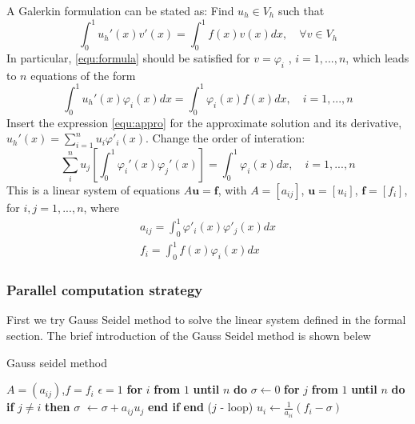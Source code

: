 \documentclass[11pt]{article}
\begin{document}
A Galerkin formulation can be stated as: Find $u_h \in V_h$ such that
\begin{equation}\label{equ:formula}
	\int_0^1u_h'(x)v'(x) = \int_0^1f(x)v(x) dx, \quad \forall v \in V_h 
\end{equation}
In particular, \eqref{equ:formula} should be satisfied for $v = \varphi_i$ , $i = 1,...,n$, which leads to $n$ equations of the form
\begin{equation}
	\int_0^1 u_h'(x)\varphi_i(x)dx = \int_0^1\varphi_i(x)f(x)dx, \quad i = 1,...,n
\end{equation}
Insert the expression \eqref{equ:appro} for the approximate solution and its derivative, $u_h'(x) = \sum_{i=1}^n u_i\varphi'_i(x)$.
Change the order of interation:
\begin{equation}
	\sum_i^n u_j\left[\int_0^1\varphi_i'(x) \varphi_j'(x)\right]= \int_0^1\varphi_i(x) dx, \quad i = 1,...,n
\end{equation}
This is a linear system of equations $A\mathbf{u} = \mathbf{f}$, with $A = [a_{ij}]$, $\mathbf{u} = [u_i]$, $\mathbf{f} = [f_i]$, for $i,j = 1,...,n$, where
\begin{align}
	a_{ij} = \int_0^1\varphi'_i(x)\varphi'_j(x)dx \\
	f_i  = \int_0^1f(x)\varphi_i(x) dx
\end{align}

\subsubsection{Parallel computation strategy}
First we try Gauss Seidel method to solve the linear system defined in the formal section. The brief introduction of the Gauss Seidel method is shown belew
\begin{algorithm}
\caption{Gauss seidel method}\label{alg:gauss_seidel}
\begin{algorithmic}
\Require $A = (a_{ij})$,$f = f_i$
\State $\epsilon=1$
\State \textbf{for} $i$ \textbf{from} $1$ \textbf{until} $n$ \textbf{do}
\State \quad $\sigma \leftarrow 0$
\State \quad \textbf{for} $j$ \textbf{from} $1$ \textbf{until} $n$ \textbf{do}
\State \quad \quad \textbf{if} $j \neq i$
\textbf{then}
\State \quad  \quad  $\sigma$ $\leftarrow \sigma + a_{ij}u_j$
\State \quad  \quad \textbf{end if}
\State \quad \textbf{end} ($j$ - loop)
\State $u_i \leftarrow \frac{1}{a_{ii}} (f_i - \sigma)$
\EndWhile
\end{algorithmic}
\end{algorithm}
\end{document}
